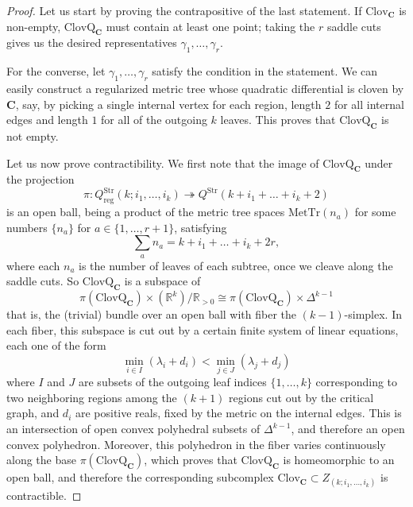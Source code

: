 \documentclass[10pt,a4paper]{amsart}
\newcommand{\RR}{\ensuremath{\mathbb{R}}}
\begin{document}
\begin{proof}
    Let us start by proving the contrapositive of the last statement. If $\mathrm{Clov}_\mathbf{C}$ is non-empty, $\mathrm{ClovQ}_\mathbf{C}$ must contain at least one point; taking the $r$ saddle cuts gives us the desired representatives $\gamma_1,\dots,\gamma_r$.

    For the converse, let $\gamma_1,\dots,\gamma_r$ satisfy the condition in the statement. We can easily construct a regularized metric tree whose quadratic differential is cloven by $\mathbf{C}$, say, by picking a single internal vertex for each region, length $2$ for all internal edges and length $1$ for all of the outgoing $k$ leaves. This proves that $\mathrm{ClovQ}_\mathbf{C}$ is not empty.

    Let us now prove contractibility. We first note that the image of $\mathrm{ClovQ}_\mathbf{C}$ under the projection
    \[ \pi \colon Q^\mathrm{Str}_\mathrm{reg}(k;i_1,\dots,i_k) \twoheadrightarrow Q^\mathrm{Str}(k + i_1 + \dots + i_k + 2) \]
    is an open ball, being a product of the metric tree spaces $\mathrm{MetTr}(n_a)$ for some numbers $\{n_a\}$ for $a \in \{1,\dots,r+1\}$, satisfying
    \[ \sum_a n_a = k + i_1 + \dots + i_k + 2r, \]
    where each $n_a$ is the number of leaves of each subtree, once we cleave along the saddle cuts. So $\mathrm{ClovQ}_\mathbf{C}$ is a subspace of
    \[ \pi(\mathrm{ClovQ}_\mathbf{C}) \times (\RR^k)/\RR_{>0} \cong \pi(\mathrm{ClovQ}_\mathbf{C}) \times \Delta^{k-1} \]
    that is, the (trivial) bundle over an open ball with fiber the $(k-1)$-simplex. In each fiber, this subspace is cut out by a certain finite system of linear equations, each one of the form
    \[ \min_{i \in I} (\lambda_i+d_i) < \min_{j \in J} (\lambda_j + d_j) \]
    where $I$ and $J$ are subsets of the outgoing leaf indices $\{1,\dots,k\}$ corresponding to two neighboring regions among the $(k+1)$ regions cut out by the critical graph, and $d_i$ are positive reals, fixed by the metric on the internal edges. This is an intersection of open convex polyhedral subsets of $\Delta^{k-1}$, and therefore an open convex polyhedron. Moreover, this polyhedron in the fiber varies continuously along the base $\pi(\mathrm{ClovQ}_\mathbf{C})$, which proves that $\mathrm{ClovQ}_\mathbf{C}$ is homeomorphic to an open ball, and therefore the corresponding subcomplex $\mathrm{Clov}_\mathbf{C} \subset  Z_{(k;i_1,\dots,i_k)}$ is contractible.
\end{proof}
\end{document}
